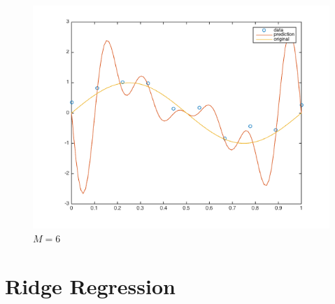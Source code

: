 \documentclass[10pt,letterpaper]{article}
\begin{document}
\begin{figure}[h!]
  \caption{$M = 3$}\label{fig:sin3}
\endminipage\hfill
{}
  \includegraphics[width=\linewidth]{figures/sin6.png}
  \caption{$M = 6$}\label{fig:sin6}
\endminipage\hfill
\end{figure}



\section{Ridge Regression}
\end{document}
